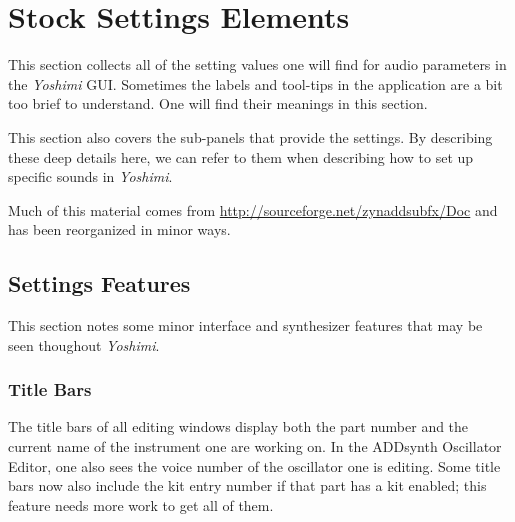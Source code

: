 %
%
%

\section{Stock Settings Elements}
\label{sec:stock_settings_elements}

   This section collects all of the setting values one will find for
   audio parameters in the \textsl{Yoshimi} GUI.
   Sometimes the labels and tool-tips
   in the application are a bit too brief to understand. 
   One will find their meanings in this section.

   This section also covers the sub-panels that provide the settings.
   By describing these deep details here, we can refer to them when
   describing how to set up specific sounds in
   \textsl{Yoshimi}.

   Much of this material comes from
   \url{http://sourceforge.net/zynaddsubfx/Doc}
   and has been reorganized in minor ways.

\subsection{Settings Features}
\label{sec:stock_settings_ui_features}

   This section notes some minor interface and synthesizer features that may
   be seen thoughout \textsl{Yoshimi}.

\subsubsection{Title Bars}
\label{subsubsec:stock_settings_elements_title_bars}

   The title bars of all editing windows display both the part number and the
   current name of the instrument one are working on.  In the ADDsynth
   Oscillator Editor, one also sees the voice number of the oscillator one is
   editing.  Some title bars now also include the kit entry number if that part
   has a kit enabled; this feature needs more work to get all of them.

